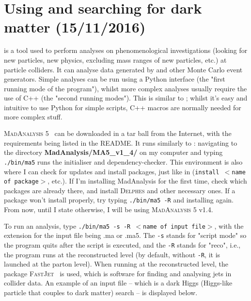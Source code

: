 
\chapter{Using \madanalysis and searching for dark matter (15/11/2016)}

\madanalysis is a tool used to perform analyses on phenomenological investigations (looking for new particles, new physics, excluding mass ranges of new particles, etc.) at particle colliders. It can analyse data generated by \madgraph and other Monte Carlo event generators. Simple analyses can be run using a Python interface (the "first running mode of the program"), whilst more complex analyses usually require the use of C++ (the "second running modes"). This is similar to \ROOT; whilst it's easy and intuitive to use Python for simple scripts, C++ macros are normally needed for more complex stuff.

\textsc{MadAnalysis 5}~\cite{Conte:2012madanalysis} can be downloaded in a tar ball from the Internet, with the requirements being listed in the README. It runs similarly to \madgraph: navigating to the directory \textbf{MadAnalysis/MA5\_v1\_4/} on my computer and typing \texttt{./bin/ma5} runs the initialiser and dependency-checker. This environment is also where I can check for updates and install packages, just like in \madgraph (\texttt{install $<$name of package$>$}, etc.). If I'm installing MadAnalysis for the first time, check which packages are already there, and install \textsc{Delphes} and other necessary ones. If a package won't install properly, try typing \texttt{./bin/ma5 -R} and installing again. From now, until I state otherwise, I will be using \textsc{MadAnalysis 5} v1.4.

To run an analysis, type \texttt{./bin/ma5  -s -R $<$name of input file$>$}, with the extension for the input file being .ma or .ma5. The \texttt{-s} stands for "script mode" so the program quits after the script is executed, and the \texttt{-R} stands for "reco", i.e., the program runs at the reconstructed level (by default, without \texttt{-R}, it is launched at the parton level). When running at the reconstructed level, the package \textsc{FastJet}~\cite{Cacciari:2011fastjet} is used, which is software for finding and analysing jets in collider data. An example of an input file -- which is a dark Higgs (Higgs-like particle that couples to dark matter) search -- is displayed below.



